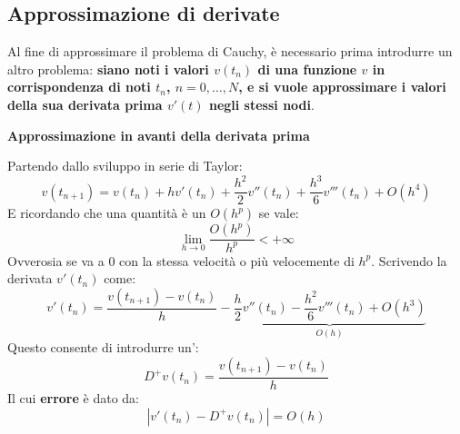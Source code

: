 \subsection{Approssimazione di derivate}

Al fine di approssimare il problema di Cauchy, è necessario prima introdurre un altro problema: \textbf{siano noti i valori $v\left(t_{n}\right)$ di una funzione $v$ in corrispondenza di noti $t_{n}$, $n=0, \dots, N$, e si vuole approssimare i valori della sua derivata prima $v'\left(t\right)$ negli stessi nodi}.

\highspace
\begin{flushleft}
	\textcolor{Red2}{ \textbf{Approssimazione in avanti della derivata prima}}
\end{flushleft}
Partendo dallo sviluppo in serie di Taylor:
\begin{equation*}
	v\left(t_{n+1}\right) = v\left(t_{n}\right) + hv'\left(t_{n}\right) + \dfrac{h^{2}}{2} v''\left(t_{n}\right) + \dfrac{h^{3}}{6} v'''\left(t_{n}\right) + O\left(h^{4}\right)
\end{equation*}
E ricordando che una quantità è un $O\left(h^{p}\right)$ se vale:
\begin{equation*}
	\lim\limits_{h \rightarrow 0} \dfrac{O\left(h^{p}\right)}{h^{p}} < +\infty
\end{equation*}
Ovverosia se va a $0$ con la stessa velocità o più velocemente di $h^{p}$. Scrivendo la derivata $v'\left(t_{n}\right)$ come:
\begin{equation*}
	v'\left(t_{n}\right) = \dfrac{v\left(t_{n+1}\right) - v\left(t_{n}\right)}{h} - \underbrace{
		\dfrac{h}{2} v''\left(t_{n}\right) - \dfrac{h^{2}}{6} v'''\left(t_{n}\right) + O\left(h^{3}\right)
	}_{O\left(h\right)}
\end{equation*}
Questo consente di introdurre un':
\begin{equation}\label{eq: approssimazione in avanti della derivata prima}
	D^{+}v\left(t_{n}\right) = \dfrac{v\left(t_{n+1}\right) - v\left(t_{n}\right)}{h}
\end{equation}
Il cui \textbf{errore} è dato da:
\begin{equation}
	\left|v'\left(t_{n}\right) - D^{+}v\left(t_{n}\right)\right| = O\left(h\right)
\end{equation}

